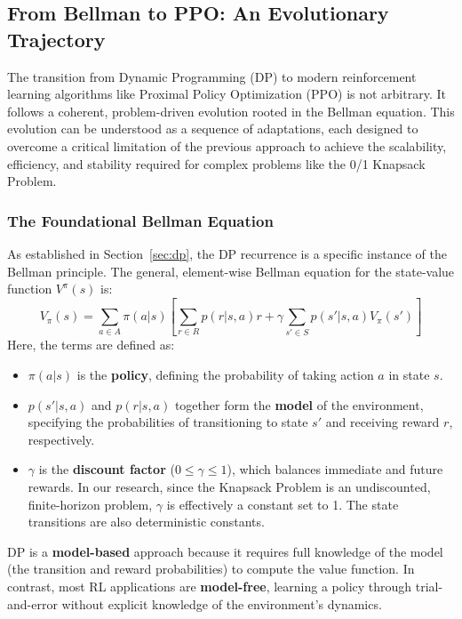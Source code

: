 \subsection{From Bellman to PPO: An Evolutionary Trajectory}
\label{sec:from-bellman-to-ppo}

The transition from Dynamic Programming (DP) to modern reinforcement learning algorithms like Proximal Policy Optimization (PPO) is not arbitrary. It follows a coherent, problem-driven evolution rooted in the Bellman equation. This evolution can be understood as a sequence of adaptations, each designed to overcome a critical limitation of the previous approach to achieve the scalability, efficiency, and stability required for complex problems like the 0/1 Knapsack Problem.

\subsubsection{The Foundational Bellman Equation}
As established in Section~\ref{sec:dp}, the DP recurrence is a specific instance of the Bellman principle. The general, element-wise Bellman equation for the state-value function \(V^\pi(s)\) is:
\begin{equation}
    \label{eq:bellman_elementwise}
    V_{\pi}(s) = \sum_{a \in A} \pi(a|s) \left[ \sum_{r \in R} p(r|s, a)r + \gamma \sum_{s' \in S} p(s'|s, a)V_{\pi}(s') \right]
\end{equation}
Here, the terms are defined as:
\begin{itemize}
    \item \(\pi(a|s)\) is the \textbf{policy}, defining the probability of taking action \(a\) in state \(s\).
    \item \(p(s'|s, a)\) and \(p(r|s, a)\) together form the \textbf{model} of the environment, specifying the probabilities of transitioning to state \(s'\) and receiving reward \(r\), respectively.
    \item \(\gamma\) is the \textbf{discount factor} (\(0 \le \gamma \le 1\)), which balances immediate and future rewards. In our research, since the Knapsack Problem is an undiscounted, finite-horizon problem, \(\gamma\) is effectively a constant set to 1. The state transitions are also deterministic constants.
\end{itemize}
DP is a \textbf{model-based} approach because it requires full knowledge of the model (the transition and reward probabilities) to compute the value function. In contrast, most RL applications are \textbf{model-free}, learning a policy through trial-and-error without explicit knowledge of the environment's dynamics.

